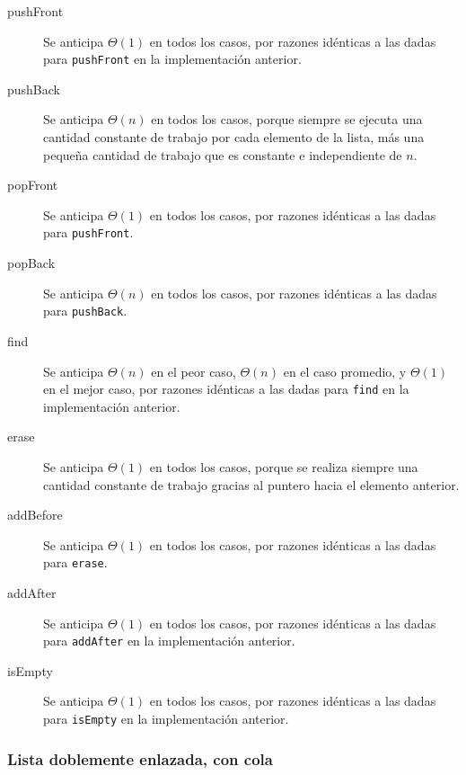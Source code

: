 \begin{description}
	\item[pushFront]{
		Se anticipa $\Theta{} (1)$ en todos los casos, por razones idénticas a las dadas para \texttt{pushFront} en la implementación anterior.
	}
	\item[pushBack]{
		Se anticipa $\Theta{} (n)$ en todos los casos, porque siempre se ejecuta una cantidad constante de trabajo por cada elemento de la lista, más una pequeña cantidad de trabajo que es constante e independiente de $n$.
	}
	\item[popFront]{
		Se anticipa $\Theta{} (1)$ en todos los casos, por razones idénticas a las dadas para \texttt{pushFront}.
	}
	\item[popBack]{
		Se anticipa $\Theta{} (n)$ en todos los casos, por razones idénticas a las dadas para \texttt{pushBack}.
	}
	\item[find]{
		Se anticipa $\Theta{} (n)$ en el peor caso, $\Theta{} (n)$ en el caso promedio, y $\Theta{} (1)$ en el mejor caso, por razones idénticas a las dadas para \texttt{find} en la implementación anterior.
	}
	\item[erase]{
		Se anticipa $\Theta{} (1)$ en todos los casos, porque se realiza siempre una cantidad constante de trabajo gracias al puntero hacia el elemento anterior.
	}
	\item[addBefore]{
		Se anticipa $\Theta{} (1)$ en todos los casos, por razones idénticas a las dadas para \texttt{erase}.
	}
	\item[addAfter]{
		Se anticipa $\Theta{} (1)$ en todos los casos, por razones idénticas a las dadas para \texttt{addAfter} en la implementación anterior.
	}
	\item[isEmpty]{
		Se anticipa $\Theta{} (1)$ en todos los casos, por razones idénticas a las dadas para \texttt{isEmpty} en la implementación anterior.
	}
\end{description}

\subsubsection{Lista doblemente enlazada, con cola}

